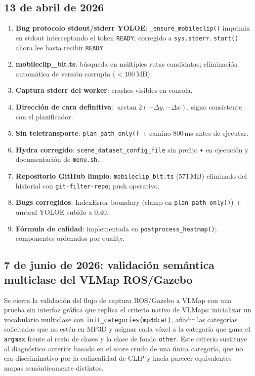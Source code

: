 \subsection*{13 de abril de 2026}

\begin{enumerate}
  \item \textbf{Bug protocolo stdout/stderr YOLOE}: \texttt{\_ensure\_mobileclip()}
        imprimía en stdout interceptando el token \texttt{READY}; corregido a
        \texttt{sys.stderr}. \texttt{start()} ahora lee hasta recibir \texttt{READY}.
  \item \textbf{mobileclip\_blt.ts}: búsqueda en múltiples rutas candidatas;
        eliminación automática de versión corrupta (\ensuremath{<100}\,MB).
  \item \textbf{Captura stderr del worker}: crashes visibles en consola.
  \item \textbf{Dirección de cara definitiva}: $\arctan2(-\Delta y, -\Delta x)$,
        signo consistente con el planificador.
  \item \textbf{Sin teletransporte}: \texttt{plan\_path\_only()} + camino 800\,ms
        antes de ejecutar.
  \item \textbf{Hydra corregido}: \texttt{scene\_dataset\_config\_file} sin prefijo
        \texttt{+} en ejecución y documentación de \texttt{menu.sh}.
  \item \textbf{Repositorio GitHub limpio}: \texttt{mobileclip\_blt.ts} (571\,MB)
        eliminado del historial con \texttt{git-filter-repo}; push operativo.
  \item \textbf{Bugs corregidos}: IndexError boundary (clamp en
        \texttt{plan\_path\_only()}) + umbral YOLOE subido a 0,40.
  \item \textbf{Fórmula de calidad}: implementada en \texttt{postprocess\_heatmap()};
        componentes ordenados por quality.
\end{enumerate}

\subsection*{7 de junio de 2026: validación semántica multiclase del VLMap ROS/Gazebo}

Se cierra la validación del flujo de captura ROS/Gazebo a VLMap con una prueba
sin interfaz gráfica que replica el criterio nativo de VLMaps: inicializar un vocabulario
multiclase con \texttt{init\_categories(mp3dcat)}, añadir las categorías
solicitadas que no estén en MP3D y asignar cada vóxel a la categoría que gana el
\texttt{argmax} frente al resto de clases y la clase de fondo \texttt{other}.
Este criterio sustituye al diagnóstico anterior basado en el score crudo de una
única categoría, que no era discriminativo por la colinealidad de CLIP y hacía
parecer equivalentes mapas semánticamente distintos.

